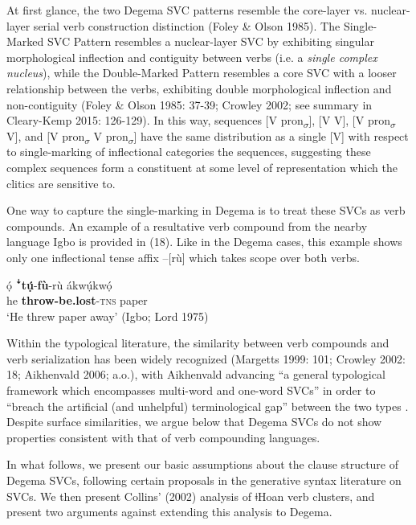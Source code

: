 \documentclass[output=paper]{langsci/langscibook}
\begin{document}
At first glance, the two Degema SVC patterns resemble the core-layer vs. nuclear-layer serial verb construction distinction (Foley \& Olson 1985). The Single-Marked SVC Pattern resembles a nuclear-layer SVC by exhibiting singular morphological inflection and contiguity between verbs (i.e. a \textit{single complex nucleus}), while the Double-Marked Pattern resembles a core SVC with a looser relationship between the verbs, exhibiting double morphological inflection and non-contiguity (Foley \& Olson 1985: 37-39; Crowley 2002; see summary in Cleary-Kemp 2015: 126-129). In this way, sequences [V pron\textsubscript{$\sigma $}], [V V], [V pron\textsubscript{$\sigma $} V], and [V pron\textsubscript{$\sigma $} V pron\textsubscript{$\sigma $}] have the same distribution as a single [V] with respect to single-marking of inflectional categories the sequences, suggesting these complex sequences form a constituent at some level of representation which the clitics are sensitive to. 

One way to capture the single-marking in Degema is to treat these SVCs as verb compounds. An example of a resultative verb compound from the nearby language Igbo is provided in (18). Like in the Degema cases, this example shows only one inflectional tense affix –[rù] which takes scope over both verbs.


\ea
\gll  ọ́    ꜜ\textbf{tụ́}{}-\textbf{fù}{}-rù      ákwụ́kwọ́\\
     he  \textbf{throw-be.lost}{}-\textsc{tns}  paper\\
\glt ‘He threw paper away’ (Igbo; Lord 1975)
\z

Within the typological literature, the similarity between verb compounds and verb serialization has been widely recognized (Margetts 1999: 101; Crowley 2002: 18; Aikhenvald 2006; a.o.), with Aikhenvald advancing “a general typological framework which encompasses multi-word and one-word SVCs” in order to “breach the artificial (and unhelpful) terminological gap” between the two types \citep[38]{Aikhenvald2006}. Despite surface similarities, we argue below that Degema SVCs do not show properties consistent with that of verb compounding languages. 

In what follows, we present our basic assumptions about the clause structure of Degema SVCs, following certain proposals in the generative syntax literature on SVCs. We then present Collins’ (2002) analysis of ǂHoan verb clusters, and present two arguments against extending this analysis to Degema. 
\end{document}
